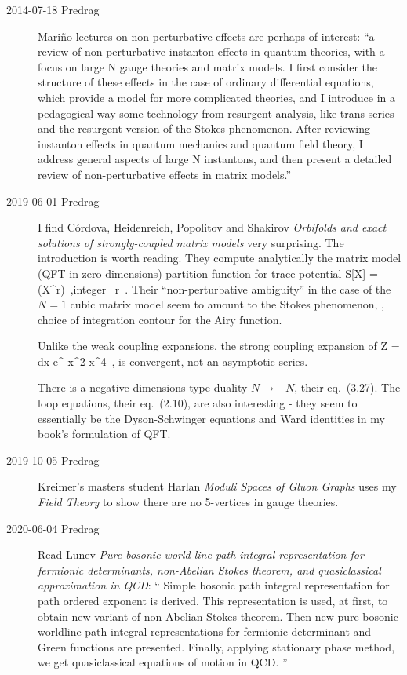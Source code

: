 \begin{description}
\item[2014-07-18 Predrag]
Mari\~no lectures on non-perturbative effects are perhaps of
interest:
 ``a review of non-perturbative
instanton effects in quantum theories, with a focus on large N gauge
theories and matrix models. I first consider the structure of these
effects in the case of ordinary differential equations, which provide a
model for more complicated theories, and I introduce in a pedagogical way
some technology from resurgent analysis, like trans-series and the
resurgent version of the Stokes phenomenon. After reviewing instanton
effects in quantum mechanics and quantum field theory, I address general
aspects of large N instantons, and then present a detailed review of
non-perturbative effects in matrix models.''

\item[2019-06-01 Predrag]
I find C{\'{o}}rdova, Heidenreich, Popolitov and Shakirov
{\em Orbifolds and exact solutions of strongly-coupled matrix models}
very surprising. The introduction is worth reading. They compute
analytically the matrix model (QFT in zero dimensions) partition function
for trace potential
\beq
S[X] = \tr(X^r) \,,\qquad\mbox{integer } r 
\,.
Their ``non-perturbative
ambiguity'' in the case of the $N = 1$ cubic matrix model seem to
amount to the Stokes phenomenon, \ie, choice of integration contour for
the Airy function.

Unlike the weak coupling expansions, the strong coupling expansion of
\beq
Z = \int dx e^{-x^2-x^4}
\,,
is convergent, not an asymptotic series.

There is a negative dimensions type duality $N\to-N$, their eq.~(3.27).
The loop equations, their eq.~(2.10), are also interesting - they seem to
essentially be the Dyson-Schwinger equations and Ward identities in my
book's formulation of QFT.

\item[2019-10-05 Predrag]
Kreimer's masters student Harlan
{\em Moduli Spaces of Gluon Graphs}
uses my {\em Field Theory} to show there are no 5-vertices
in gauge theories.

\item[2020-06-04 Predrag]
Read Lunev {\em Pure bosonic world-line path integral
representation for fermionic determinants, non-{Abelian} {Stokes}
theorem, and quasiclassical approximation in {QCD}}: ``
Simple bosonic path integral representation for path ordered exponent is
derived. This representation is used, at first, to obtain new variant of
non-Abelian Stokes theorem. Then new pure bosonic worldline path integral
representations for fermionic determinant and Green functions are
presented. Finally, applying stationary phase method, we get
quasiclassical equations of motion in QCD.
''


\end{description}

